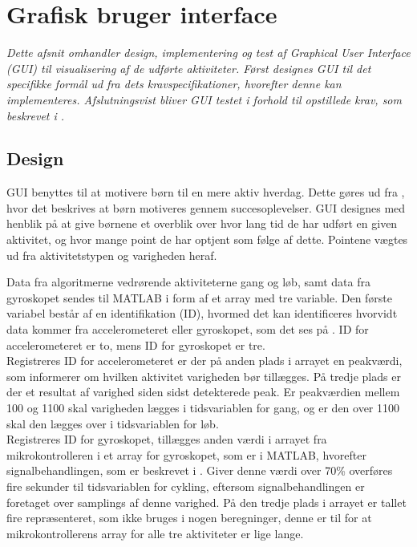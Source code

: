 \section{Grafisk bruger interface}\label{GUI_design}
\textit{Dette afsnit omhandler design, implementering og test af Graphical User Interface (GUI) til visualisering af de udførte aktiviteter. Først designes GUI til det specifikke formål ud fra dets kravspecifikationer, hvorefter denne kan implementeres. Afslutningsvist bliver GUI testet i forhold til opstillede krav, som beskrevet i .}

\subsection{Design}
GUI benyttes til at motivere børn til en mere aktiv hverdag. Dette gøres ud fra , hvor det beskrives at børn motiveres gennem succesoplevelser. GUI designes med henblik på at give børnene et overblik over hvor lang tid de har udført en given aktivitet, og hvor mange point de har optjent som følge af dette. Pointene vægtes ud fra aktivitetstypen og varigheden heraf. 

Data fra algoritmerne vedrørende aktiviteterne gang og løb, samt data fra gyroskopet sendes til MATLAB i form af et array med tre variable. Den første variabel består af en identifikation (ID), hvormed det kan identificeres hvorvidt data kommer fra accelerometeret eller gyroskopet, som det ses på . ID for accelerometeret er to, mens ID for gyroskopet er tre.\\
Registreres ID for accelerometeret er der på anden plads i arrayet en peakværdi, som informerer om hvilken aktivitet varigheden bør tillægges. På tredje plads er der et resultat af varighed siden sidst detekterede peak. Er peakværdien mellem 100 og 1100 skal varigheden lægges i tidsvariablen for gang, og er den over 1100 skal den lægges over i tidsvariablen for løb.\\
Registreres ID for gyroskopet, tillægges anden værdi i arrayet fra mikrokontrolleren i et array for gyroskopet, som er i MATLAB, hvorefter signalbehandlingen, som er beskrevet i . Giver denne værdi over 70\% overføres fire sekunder til tidsvariablen for cykling, eftersom signalbehandlingen er foretaget over samplings af denne varighed. På den tredje plads i arrayet er tallet fire repræsenteret, som ikke bruges i nogen beregninger, denne er til for at mikrokontrollerens array for alle tre aktiviteter er lige lange. 

